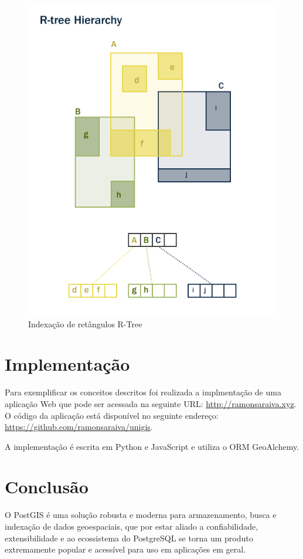 \documentclass[12pt]{article}
\begin{document}
\begin{figure}[ht]
  \centering
  \includegraphics[width=.5\textwidth]{indexes_rtree.png}
  \caption{Indexação de retângulos R-Tree}
  \label{fig:indexes_rtree}
\end{figure}
\section{Implementação}

Para exemplificar os conceitos descritos foi realizada a implmentação de uma
aplicação Web que pode ser acessada na seguinte URL:
\url{http://ramonsaraiva.xyz}. O código da aplicação está disponível no
seguinte endereço: \url{https://github.com/ramonsaraiva/unigis}.

A implementação é escrita em Python e JavaScript e utiliza o ORM GeoAlchemy.

\section{Conclusão}

O PostGIS é uma solução robusta e moderna para armazenamento, busca e indexação
de dados geoespaciais, que por estar aliado a confiabilidade, extensibilidade e
ao ecossistema do PostgreSQL se torna um produto extremamente popular e
acessível para uso em aplicações em geral.



\nocite{*}
\end{document}
